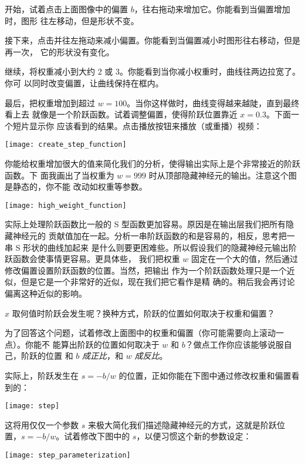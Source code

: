 开始，试着点击上面图像中的偏置 $b$，往右拖动来增加它。你能看到当偏置增加时，图形
往左移动，但是形状不变。

接下来，点击并往左拖动来减小偏置。你能看到当偏置减小时图形往右移动，但是再一次，
它的形状没有变化。

继续，将权重减小到大约 $2$ 或 $3$。你能看到当你减小权重时，曲线往两边拉宽了。你可
以同时改变偏置，让曲线保持在框内。

最后，把权重增加到超过 $w = 100$。当你这样做时，曲线变得越来越陡，直到最终看上去
就像是一个阶跃函数。试着调整偏置，使得阶跃位置靠近 $x = 0.3$。下面一个短片显示你
应该看到的结果。点击播放按钮来播放（或重播）视频：
\begin{center}
  \texttt{[image: create\_step\_function]}
\end{center}

你能给权重增加很大的值来简化我们的分析，使得输出实际上是个非常接近的阶跃函数。下
面我画出了当权重为 $w = 999$ 时从顶部隐藏神经元的输出。注意这个图是静态的，你不能
改动如权重等参数。
\begin{center}
  \texttt{[image: high\_weight\_function]}
\end{center}

实际上处理阶跃函数比一般的 S 型函数更加容易。原因是在输出层我们把所有隐藏神经元的
贡献值加在一起。分析一串阶跃函数的和是容易的，相反，思考把一串 S 形状的曲线加起来
是什么则要更困难些。所以假设我们的隐藏神经元输出阶跃函数会使事情更容易。更具体些，
我们把权重 $w$ 固定在一个大的值，然后通过修改偏置设置阶跃函数的位置。当然，把输出
作为一个阶跃函数处理只是一个近似，但是它是一个非常好的近似，现在我们把它看作是精
确的。稍后我会再讨论偏离这种近似的影响。

$x$ 取何值时阶跃会发生呢？换种方式，阶跃的位置如何取决于权重和偏置？

为了回答这个问题，试着修改上面图中的权重和偏置（你可能需要向上滚动一点）。你能不
能算出阶跃的位置如何取决于 $w$ 和 $b$？做点工作你应该能够说服自己，阶跃的位置
和 $b$ \emph{成正比}，和 $w$ \emph{成反比}。

实际上，阶跃发生在 $s = -b/w$ 的位置，正如你能在下图中通过修改权重和偏置看到的：
\begin{center}
  \texttt{[image: step]}
\end{center}

这将用仅仅一个参数 $s$ 来极大简化我们描述隐藏神经元的方式，这就是阶跃位置，$s =
-b/w$。试着修改下图中的 $s$，以便习惯这个新的参数设定：
\begin{center}
  \texttt{[image: step\_parameterization]}
\end{center}

